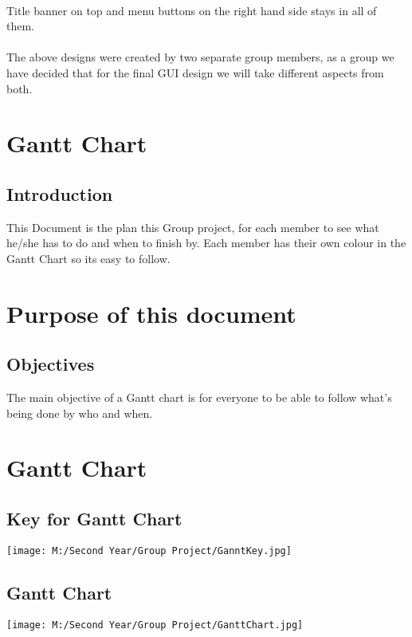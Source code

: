 \documentclass[titlepage]{article}
\begin{document}
\paragraph{} Title banner on top and menu buttons on the right hand side stays in all of them.
\paragraph{} The above designs were created by two separate group members, as a group we have decided that for the final GUI design we will take different aspects from both.
\newpage
\section{Gantt Chart}
\subsection{Introduction}
This Document is the plan this Group project, for each member to see what he/she has to do and when to finish by. Each member has their own colour in the Gantt Chart so its easy to follow.
\section{Purpose of this document}
\subsection{Objectives}
The main objective of a Gantt chart is for everyone to be able to follow what's being done by who and when.
\section{Gantt Chart}
\subsection{Key for Gantt Chart}
\begin{figure*}[h]
\centering
\texttt{[image: M:/Second Year/Group Project/GanntKey.jpg]}
\label{fig:GanntKey}
\end{figure*}
\newpage
\subsection{Gantt Chart}
\begin{figure*}[h]
\centering
\texttt{[image: M:/Second Year/Group Project/GanttChart.jpg]}
\label{fig:GanttChart}
\end{figure*}
\newpage
\end{document}
